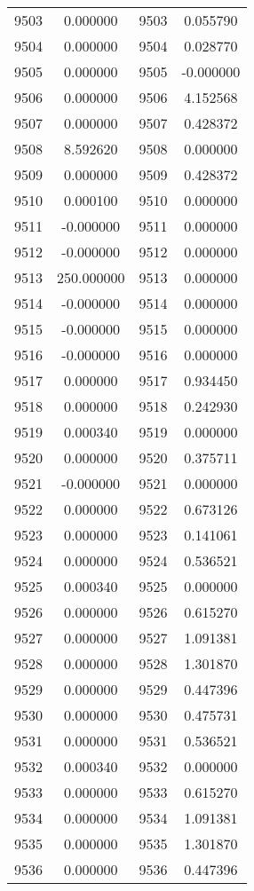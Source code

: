 \documentclass[12pt]{article}
\begin{document}
\begin{longtable}{@{}cccc@{}}
9503 & 0.000000 & 9503 & 0.055790 \\
9504 & 0.000000 & 9504 & 0.028770 \\
9505 & 0.000000 & 9505 & -0.000000 \\
9506 & 0.000000 & 9506 & 4.152568 \\
9507 & 0.000000 & 9507 & 0.428372 \\
9508 & 8.592620 & 9508 & 0.000000 \\
9509 & 0.000000 & 9509 & 0.428372 \\
9510 & 0.000100 & 9510 & 0.000000 \\
9511 & -0.000000 & 9511 & 0.000000 \\
9512 & -0.000000 & 9512 & 0.000000 \\
9513 & 250.000000 & 9513 & 0.000000 \\
9514 & -0.000000 & 9514 & 0.000000 \\
9515 & -0.000000 & 9515 & 0.000000 \\
9516 & -0.000000 & 9516 & 0.000000 \\
9517 & 0.000000 & 9517 & 0.934450 \\
9518 & 0.000000 & 9518 & 0.242930 \\
9519 & 0.000340 & 9519 & 0.000000 \\
9520 & 0.000000 & 9520 & 0.375711 \\
9521 & -0.000000 & 9521 & 0.000000 \\
9522 & 0.000000 & 9522 & 0.673126 \\
9523 & 0.000000 & 9523 & 0.141061 \\
9524 & 0.000000 & 9524 & 0.536521 \\
9525 & 0.000340 & 9525 & 0.000000 \\
9526 & 0.000000 & 9526 & 0.615270 \\
9527 & 0.000000 & 9527 & 1.091381 \\
9528 & 0.000000 & 9528 & 1.301870 \\
9529 & 0.000000 & 9529 & 0.447396 \\
9530 & 0.000000 & 9530 & 0.475731 \\
9531 & 0.000000 & 9531 & 0.536521 \\
9532 & 0.000340 & 9532 & 0.000000 \\
9533 & 0.000000 & 9533 & 0.615270 \\
9534 & 0.000000 & 9534 & 1.091381 \\
9535 & 0.000000 & 9535 & 1.301870 \\
9536 & 0.000000 & 9536 & 0.447396 \\

\end{longtable}
\end{document}
